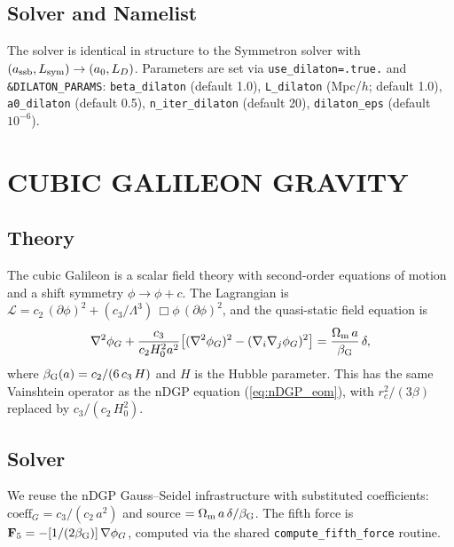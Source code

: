 \documentclass[fleqn,usenatbib]{mnras}
\newcommand{\code}[1]{\texttt{#1}}
\newcommand{\Om}{\Omega_{\rm m}}
\newcommand{\betaG}{\beta_{\rm G}}
\begin{document}
\subsection{Solver and Namelist}

The solver is identical in structure to the Symmetron solver with
$(a_{\rm ssb}, L_{\rm sym}) \to (a_0, L_D)$.  Parameters are set
via \code{use\_dilaton=.true.} and \code{\&DILATON\_PARAMS}:
\code{beta\_dilaton} (default 1.0),
\code{L\_dilaton} (Mpc/$h$; default 1.0),
\code{a0\_dilaton} (default 0.5),
\code{n\_iter\_dilaton} (default 20),
\code{dilaton\_eps} (default $10^{-6}$).


\section{CUBIC GALILEON GRAVITY}
\label{sec:galileon}

\subsection{Theory}

The cubic Galileon \citep{Nicolis2009,Deffayet2009a} is a scalar field
theory with second-order equations of motion and a shift symmetry
$\phi \to \phi + c$.  The Lagrangian is
$\mathcal{L} = c_2\,(\partial\phi)^2 + (c_3/\Lambda^3)\,
\Box\phi\,(\partial\phi)^2$, and the quasi-static field equation is
\begin{equation}
\nabla^2\phi_G + \frac{c_3}{c_2 H_0^2 a^2}
\bigl[(\nabla^2\phi_G)^2
  - (\nabla_i\nabla_j\phi_G)^2\bigr]
= \frac{\Om\,a}{\betaG}\,\delta,
\label{eq:galileon_eom}
\end{equation}
where $\betaG(a) = c_2/(6\,c_3\,H)$ and $H$ is the Hubble parameter.
This has the same Vainshtein operator as the nDGP equation
(\ref{eq:nDGP_eom}), with $r_c^2/(3\beta)$ replaced by
$c_3/(c_2\,H_0^2)$.

\subsection{Solver}

We reuse the nDGP Gauss--Seidel infrastructure with substituted
coefficients:
$\mathrm{coeff}_G = c_3/(c_2\,a^2)$ and source
$= \Om\,a\,\delta/\betaG$.  The fifth force is
$\mathbf{F}_5 = -[1/(2\betaG)]\,\nabla\phi_G$, computed via the
shared \code{compute\_fifth\_force} routine.
\end{document}
